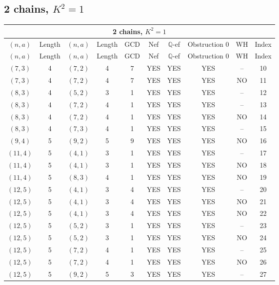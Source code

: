 \subsection{2 chains, $K^2 = 1$}
\begin{longtable}{|c|c|c|c|c|c|c|c|c|c|}
\hline
\multicolumn{10}{|c|}{2 chains, $K^2 = 1$}\\
\hline
$(n,a)$ & Length & $(n,a)$ & Length & GCD & Nef & $\mathbb Q$-ef & Obstruction 0 & WH & Index\\
\hline
\endfirsthead

\hline
$(n,a)$ & Length & $(n,a)$ & Length & GCD & Nef & $\mathbb Q$-ef & Obstruction 0 & WH & Index\\
\hline
\endhead
\hline
\endfoot

$(7, 3)$ & 4 & $(7, 2)$ & 4 & 7 & YES & YES & YES & -- & 10\\
$(7, 3)$ & 4 & $(7, 2)$ & 4 & 7 & YES & YES & YES & NO & 11\\
$(8, 3)$ & 4 & $(5, 2)$ & 3 & 1 & YES & YES & YES & -- & 12\\
$(8, 3)$ & 4 & $(7, 2)$ & 4 & 1 & YES & YES & YES & -- & 13\\
$(8, 3)$ & 4 & $(7, 2)$ & 4 & 1 & YES & YES & YES & NO & 14\\
$(8, 3)$ & 4 & $(7, 3)$ & 4 & 1 & YES & YES & YES & -- & 15\\
$(9, 4)$ & 5 & $(9, 2)$ & 5 & 9 & YES & YES & YES & NO & 16\\
$(11, 4)$ & 5 & $(4, 1)$ & 3 & 1 & YES & YES & YES & -- & 17\\
$(11, 4)$ & 5 & $(4, 1)$ & 3 & 1 & YES & YES & YES & NO & 18\\
$(11, 4)$ & 5 & $(8, 3)$ & 4 & 1 & YES & YES & YES & NO & 19\\
$(12, 5)$ & 5 & $(4, 1)$ & 3 & 4 & YES & YES & YES & -- & 20\\
$(12, 5)$ & 5 & $(4, 1)$ & 3 & 4 & YES & YES & YES & NO & 21\\
$(12, 5)$ & 5 & $(4, 1)$ & 3 & 4 & YES & YES & YES & NO & 22\\
$(12, 5)$ & 5 & $(5, 2)$ & 3 & 1 & YES & YES & YES & -- & 23\\
$(12, 5)$ & 5 & $(5, 2)$ & 3 & 1 & YES & YES & YES & NO & 24\\
$(12, 5)$ & 5 & $(7, 2)$ & 4 & 1 & YES & YES & YES & -- & 25\\
$(12, 5)$ & 5 & $(7, 2)$ & 4 & 1 & YES & YES & YES & NO & 26\\
$(12, 5)$ & 5 & $(9, 2)$ & 5 & 3 & YES & YES & YES & -- & 27\\

\end{longtable}

